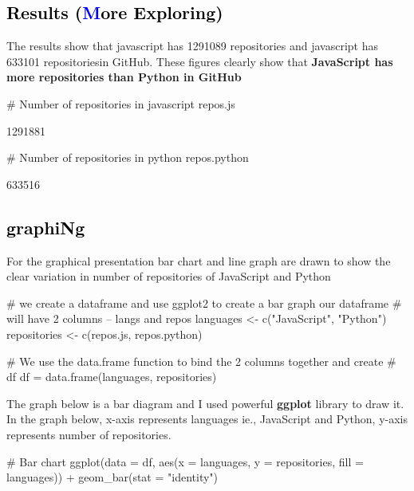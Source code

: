 \documentclass{article}\usepackage[]{graphicx}\usepackage[]{color}
\begin{document}
{\subsection*{\Large\textcolor{black}{Results (\textcolor{blue}{M}\textcolor{black}{ore Exploring)}}}
The results show that javascript has 1291089 repositories and javascript has 633101 repositoriesin GitHub. These figures clearly show that \textbf{JavaScript has more repositories than Python in GitHub}

\begin{Schunk}
\begin{Sinput}
# Number of repositories in javascript
repos.js
\end{Sinput}
\begin{Soutput}
[1] 1291881
\end{Soutput}
\begin{Sinput}
# Number of repositories in python
repos.python
\end{Sinput}
\begin{Soutput}
[1] 633516
\end{Soutput}
\end{Schunk}

\subsection*{\Large\textcolor{black}{graphiNg}}
For the graphical presentation bar chart and line graph are drawn to show the clear variation in number of repositories of JavaScript and Python

\begin{Schunk}
\begin{Sinput}
# we create a dataframe and use ggplot2 to create a bar graph our dataframe
# will have 2 columns -- langs and repos
languages <- c("JavaScript", "Python")
repositories <- c(repos.js, repos.python)

# We use the data.frame function to bind the 2 columns together and create
# df
df = data.frame(languages, repositories)
\end{Sinput}
\end{Schunk}

The graph below is a bar diagram and I used powerful \textbf{ggplot} library to draw it. In the graph below, x-axis represents languages ie., JavaScript and Python, y-axis represents number of repositories.  

\begin{Schunk}
\begin{Sinput}
# Bar chart
ggplot(data = df, aes(x = languages, y = repositories, fill = languages)) + 
    geom_bar(stat = "identity")
\end{Sinput}


\end{Schunk}}
\end{document}
